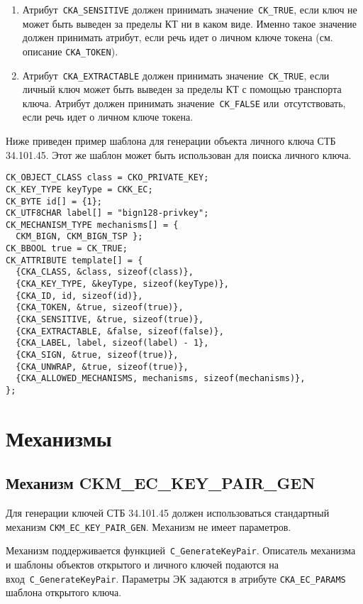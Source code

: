 \begin{enumerate}
\item
Атрибут~\verb|CKA_SENSITIVE| должен принимать значение~\verb|CK_TRUE|,
если ключ не может быть выведен за пределы КТ ни в каком виде.
%
Именно такое значение должен принимать атрибут,
если речь идет о личном ключе токена (см. описание \verb|CKA_TOKEN|). 

\item
Атрибут~\verb|CKA_EXTRACTABLE| должен принимать значение~\verb|CK_TRUE|,
если личный ключ может быть выведен за пределы КТ с помощью транспорта 
ключа. 
%
Атрибут должен принимать значение~\verb|CK_FALSE| или~отсутствовать, если 
речь идет о личном ключе токена.
\end{enumerate}

Ниже приведен пример шаблона для генерации объекта личного ключа СТБ 
34.101.45. Этот же шаблон может быть использован для поиска личного ключа.

\begin{verbatim}
CK_OBJECT_CLASS class = CKO_PRIVATE_KEY;
CK_KEY_TYPE keyType = CKK_EC;
CK_BYTE id[] = {1};
CK_UTF8CHAR label[] = "bign128-privkey";
CK_MECHANISM_TYPE mechanisms[] = {
  CKM_BIGN, CKM_BIGN_TSP };
CK_BBOOL true = CK_TRUE;
CK_ATTRIBUTE template[] = {
  {CKA_CLASS, &class, sizeof(class)},
  {CKA_KEY_TYPE, &keyType, sizeof(keyType)},
  {CKA_ID, id, sizeof(id)},
  {CKA_TOKEN, &true, sizeof(true)},
  {CKA_SENSITIVE, &true, sizeof(true)},
  {CKA_EXTRACTABLE, &false, sizeof(false)},
  {CKA_LABEL, label, sizeof(label) - 1},
  {CKA_SIGN, &true, sizeof(true)},
  {CKA_UNWRAP, &true, sizeof(true)},
  {CKA_ALLOWED_MECHANISMS, mechanisms, sizeof(mechanisms)},
};
\end{verbatim}

\section{Механизмы}
                                                                                                                 
\subsection{Механизм CKM\_EC\_KEY\_PAIR\_GEN}\label{CRYPTOKI.Gen}


Для генерации ключей СТБ 34.101.45 должен использоваться стандартный 
механизм \verb|CKM_EC_KEY_PAIR_GEN|. Механизм не имеет параметров. 

Механизм поддерживается функцией~\verb|C_GenerateKeyPair|. 
%
Описатель механизма и шаблоны объектов открытого и личного
ключей подаются на вход~\verb|C_GenerateKeyPair|. Параметры ЭК задаются в 
атрибуте \verb|CKA_EC_PARAMS| шаблона открытого ключа.

